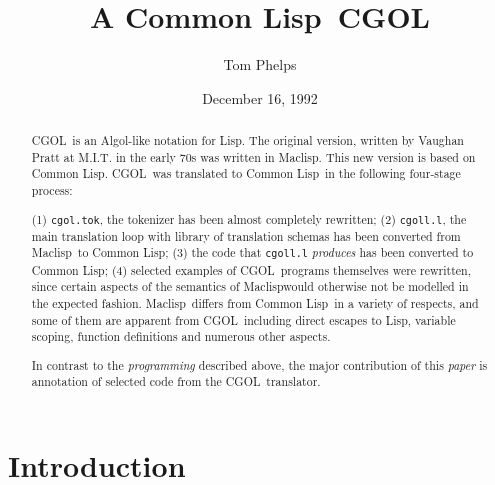 % 
\newcommand{\code}[1]{{\tt #1}}
\newcommand{\coderef}[1]{\addcontentsline{toc}{subsubsection}{\code{#1}}}
\newcommand{\cgol}{CGOL}	%
\newcommand{\ml}{Maclisp}
\newcommand{\cl}{Common Lisp}



\title{A \cl\ \cgol}
\author{Tom Phelps}
\date{December 16, 1992}

\maketitle

\begin{abstract}

\cgol\ is an Algol-like notation for Lisp. The original
version, written by Vaughan Pratt at M.I.T. in the early 70s was
written in \ml. This new version is based on \cl. 
\cgol\ was translated to \cl\ in the
following four-stage process:

(1) \code{cgol.tok}, the tokenizer has been almost completely rewritten;
(2) \code{cgoll.l}, the main translation loop with library of translation
schemas has been converted from \ml\ to \cl; (3) the code that \code{cgoll.l}
{\it produces} has been converted to \cl; (4) selected examples of \cgol\
programs themselves were rewritten, since
certain aspects of the semantics of \ml would otherwise not
be modelled in the expected fashion.  \ml\ differs from \cl\ in a
variety of respects, and some of them are apparent from \cgol\  including
direct escapes to Lisp, variable scoping,  function definitions and 
numerous other aspects.

In contrast to the {\it programming} described above, the major
contribution of this {\it paper} is annotation of selected code from the
\cgol\ translator.
\end{abstract}


\newpage

\tableofcontents

\newpage

\section {Introduction}

